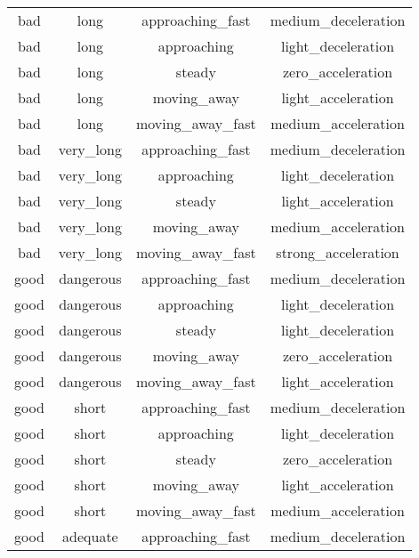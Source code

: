 \begin{table}[!htbp]
{\begin{tabular}{|c|c|c|c|}
            bad       & long        & approaching\_fast     & medium\_deceleration \\
            bad       & long        & approaching          & light\_deceleration \\
            bad       & long        & steady               & zero\_acceleration \\
            bad       & long        & moving\_away         & light\_acceleration \\
            bad       & long        & moving\_away\_fast   & medium\_acceleration \\
            bad       & very\_long  & approaching\_fast     & medium\_deceleration \\
            bad       & very\_long  & approaching          & light\_deceleration \\
            bad       & very\_long  & steady               & light\_acceleration \\
            bad       & very\_long  & moving\_away         & medium\_acceleration \\
            bad       & very\_long  & moving\_away\_fast   & strong\_acceleration \\
            good      & dangerous   & approaching\_fast     & medium\_deceleration \\
            good      & dangerous   & approaching          & light\_deceleration \\
            good      & dangerous   & steady               & light\_deceleration \\
            good      & dangerous   & moving\_away         & zero\_acceleration \\
            good      & dangerous   & moving\_away\_fast   & light\_acceleration \\
            good      & short       & approaching\_fast     & medium\_deceleration \\
            good      & short       & approaching          & light\_deceleration \\
            good      & short       & steady               & zero\_acceleration \\
            good      & short       & moving\_away         & light\_acceleration \\
            good      & short       & moving\_away\_fast   & medium\_acceleration \\
            good      & adequate    & approaching\_fast     & medium\_deceleration \\

\end{tabular}}
\end{table}
